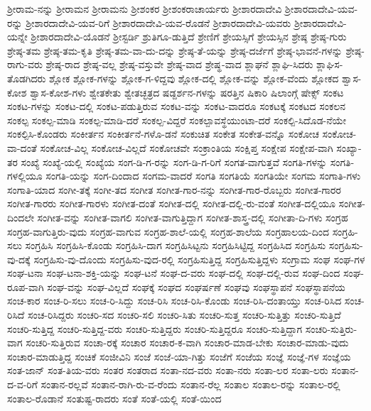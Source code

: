 {ಶ್ರೀರಾಮ-ನನ್ನು
ಶ್ರೀರಾಮನ
ಶ್ರೀರಾಮನು
ಶ್ರೀಶಂಕರ
ಶ್ರೀಶಂಕರಾಚಾರ್ಯರು
ಶ್ರೀಶಾರದಾದೇವಿ
ಶ್ರೀಶಾರದಾದೇವಿ-ಯವ-ರನ್ನು
ಶ್ರೀಶಾರದಾದೇವಿ-ಯವ-ರಿಗೆ
ಶ್ರೀಶಾರದಾದೇವಿ-ಯವ-ರೊಡನೆ
ಶ್ರೀಶಾರದಾದೇವಿ-ಯವರು
ಶ್ರೀಶಾರದಾದೇವಿ-ಯನ್ನೇ
ಶ್ರೀಶಾರದಾದೇವಿ-ಯೊಡನೆ
ಶ್ರೀಸ್ಟರ್ಡಿ
ಶ್ರುತಿಗೂ-ಡುತ್ತಿದೆ
ಶ್ರೇಣಿಗೆ
ಶ್ರೇಯಸ್ಸಿಗೆ
ಶ್ರೇಯಸ್ಸಿನ
ಶ್ರೇಷ್ಠ
ಶ್ರೇಷ್ಠ-ಗುರು
ಶ್ರೇಷ್ಠ-ತಮ
ಶ್ರೇಷ್ಠ-ತಮ-ಕೃತಿ
ಶ್ರೇಷ್ಠ-ತಮ-ವಾ-ದು-ದನ್ನು
ಶ್ರೇಷ್ಠ-ತೆ-ಯನ್ನು
ಶ್ರೇಷ್ಠ-ದರ್ಜೆಗೆ
ಶ್ರೇಷ್ಠ-ಭಾವನೆ-ಗಳನ್ನು
ಶ್ರೇಷ್ಠ-ರಾಗು-ವರು
ಶ್ರೇಷ್ಠ-ರಾದ
ಶ್ರೇಷ್ಠ-ವಲ್ಲ
ಶ್ರೇಷ್ಠ-ವಸ್ತುವೇ
ಶ್ರೇಷ್ಠ-ವಾದ
ಶ್ರೇಷ್ಥ-ವಾದ
ಶ್ಲಾಘನೆ
ಶ್ಲಾಘಿ-ಸಿದರು
ಶ್ಲಾಘಿಸ-ತೊಡಗಿದರು
ಶ್ಲೋಕ
ಶ್ಲೋಕ-ಗಳನ್ನು
ಶ್ಲೋಕ-ಗ-ಳಿದ್ದವು
ಶ್ಲೋಕ-ದಲ್ಲಿ
ಶ್ಲೋಕ-ವನ್ನು
ಶ್ಲೋಕ-ವೆಂದು
ಶ್ಲೋಕದ
ಶ್ವಾಸ-ಕೋಶ
ಶ್ವಾಸ-ಕೋಶ-ಗಳು
ಶ್ವೇತಕೇತು
ಶ್ವೇತಚ್ಛತ್ರದ
ಷಡ್ದರ್ಶನ-ಗಳನ್ನು
ಷರತ್ತಿನ
ಷಿಕಾರಿ
ಷಿಲಾಂಗ್ಗೆ
ಷೇಕ್ಸ್
ಸಂಕಟ
ಸಂಕಟ-ಗಳನ್ನು
ಸಂಕಟ-ದಲ್ಲಿ
ಸಂಕಟ-ಪಡುತ್ತಿರುವ
ಸಂಕಟ-ವನ್ನು
ಸಂಕಟ-ವಾದರೂ
ಸಂಕಟಕ್ಕೆ
ಸಂಕಟದ
ಸಂಕಲನ
ಸಂಕಲ್ಪ
ಸಂಕಲ್ಪ-ಮಾಡಿ
ಸಂಕಲ್ಪ-ಮಾಡಿ-ದರೆ
ಸಂಕಲ್ಪ-ವಿದ್ದರೆ
ಸಂಕಲ್ಪಾವಸ್ಥೆಯುಂಟಾ-ದರೆ
ಸಂಕಲ್ಪಿ-ಸಿದೊಡ-ನೆಯೇ
ಸಂಕಲ್ಪಿಸಿ-ಕೊಂಡರು
ಸಂಕೀರ್ತನ
ಸಂಕೀರ್ತನೆ-ಗಳೊ-ಡನೆ
ಸಂಕುಚಿತ
ಸಂಕೇತ
ಸಂಕೇತ-ವನ್ನೊ
ಸಂಕೋಚ
ಸಂಕೋಚ-ವಾ-ದಂತೆ
ಸಂಕೋಚ-ವಿಲ್ಲ
ಸಂಕೋಚ-ವಿಲ್ಲದೆ
ಸಂಕೋಚವೇ
ಸಂಕ್ರಾಂತಿಯ
ಸಂಕ್ಷಿಪ್ತ
ಸಂಕ್ಷೇಪ
ಸಂಕ್ಷೇಪ-ವಾಗಿ
ಸಂಖ್ಯಾ-ತರ
ಸಂಖ್ಯೆ
ಸಂಖ್ಯೆ-ಯಲ್ಲಿ
ಸಂಖ್ಯೆಯ
ಸಂಗ-ಡಿ-ಗ-ರನ್ನು
ಸಂಗ-ಡಿ-ಗ-ರಿಗೆ
ಸಂಗತ-ವಾಗುತ್ತವೆ
ಸಂಗತಿ-ಗಳನ್ನು
ಸಂಗತಿ-ಗಳಲ್ಲಿಯೂ
ಸಂಗತಿ-ಯನ್ನು
ಸಂಗ-ದಿಂದಾದ
ಸಂಗಮ-ವಾದರೆ
ಸಂಗತಿ
ಸಂಗತಿಯೆ
ಸಂಗತಿಯೇ
ಸಂಗಮ
ಸಂಗಾತಿ-ಗಳು
ಸಂಗಾತಿ-ಯಾದ
ಸಂಗೀ-ತಕ್ಕೆ
ಸಂಗೀ-ತದ
ಸಂಗೀತ
ಸಂಗೀತ-ಗಾರ-ನನ್ನು
ಸಂಗೀತ-ಗಾರ-ರೊಬ್ಬರು
ಸಂಗೀತ-ಗಾರರ
ಸಂಗೀತ-ಗಾರರು
ಸಂಗೀತ-ಗಾರಳು
ಸಂಗೀತ-ದಂತೆ
ಸಂಗೀತ-ದಲ್ಲಿ
ಸಂಗೀತ-ದಲ್ಲಿ-ರು-ವಂತೆ
ಸಂಗೀತ-ದಲ್ಲಿಯೂ
ಸಂಗೀತ-ದಿಂದಲೇ
ಸಂಗೀತ-ವನ್ನು
ಸಂಗೀತ-ವಾಗಲಿ
ಸಂಗೀತ-ವಾಗುತ್ತಿದ್ದಾಗ
ಸಂಗೀತ-ಶಾಸ್ತ್ರ-ದಲ್ಲಿ
ಸಂಗೀತಾ-ದಿ-ಗಳು
ಸಂಗ್ರಹ
ಸಂಗ್ರಹ-ವಾಗುತ್ತಿರು-ವುದು
ಸಂಗ್ರಹ-ವಾಗುವ
ಸಂಗ್ರಹ-ಶಾಲೆ-ಯಲ್ಲಿ
ಸಂಗ್ರಹ-ಶಾಲೆಯ
ಸಂಗ್ರಹಾಲಯ-ದಿಂದ
ಸಂಗ್ರಹಿ-ಸಲು
ಸಂಗ್ರಹಿಸಿ
ಸಂಗ್ರಹಿಸಿ-ಕೊಂಡು
ಸಂಗ್ರಹಿಸಿ-ದಾಗ
ಸಂಗ್ರಹಿಸಿಟ್ಟನು
ಸಂಗ್ರಹಿಸಿಟ್ಟಿದ್ದ
ಸಂಗ್ರಹಿಸಿದ
ಸಂಗ್ರಹಿಸು
ಸಂಗ್ರಹಿಸು-ವು-ದಕ್ಕೆ
ಸಂಗ್ರಹಿಸು-ವು-ದೊಂದು
ಸಂಗ್ರಹಿಸು-ವುದ-ರಲ್ಲಿ
ಸಂಗ್ರಹಿಸುತ್ತಿದ್ದ
ಸಂಗ್ರಹಿಸುತ್ತಿದ್ದಳು
ಸಂಗ್ರಾಮ
ಸಂಘ
ಸಂಘ-ಗಳ
ಸಂಘ-ಟನಾ
ಸಂಘ-ಟನಾ-ಶಕ್ತಿ-ಯನ್ನು
ಸಂಘ-ಟನೆ
ಸಂಘ-ದ-ವರು
ಸಂಘ-ದಲ್ಲಿ
ಸಂಘ-ದಲ್ಲಿ-ರುವ
ಸಂಘ-ದಿಂದ
ಸಂಘ-ರೂಪ-ವಾಗಿ
ಸಂಘ-ವನ್ನು
ಸಂಘ-ವಿಲ್ಲದೆ
ಸಂಘಕ್ಕೆ
ಸಂಘದ
ಸಂಘರ್ಷಣೆ
ಸಂಘವು
ಸಂಘಸ್ಥಾಪನೆ
ಸಂಘಸ್ಥಾಪನೆಯ
ಸಂಚ-ಕಾರ
ಸಂಚ-ರಿ-ಸಲು
ಸಂಚ-ರಿ-ಸಿದ್ದು
ಸಂಚ-ರಿಸಿ
ಸಂಚ-ರಿಸಿ-ಕೊಂಡು
ಸಂಚ-ರಿಸಿ-ದಂತಾಯ್ತು
ಸಂಚ-ರಿಸಿದ
ಸಂಚ-ರಿಸಿದೆ
ಸಂಚ-ರಿಸಿದ್ದರು
ಸಂಚರಿ-ಸದ
ಸಂಚರಿ-ಸಲಿ
ಸಂಚರಿ-ಸಿತು
ಸಂಚರಿ-ಸುತ್ತ
ಸಂಚರಿ-ಸುತ್ತಿತ್ತು
ಸಂಚರಿ-ಸುತ್ತಿದೆ
ಸಂಚರಿ-ಸುತ್ತಿದ್ದ
ಸಂಚರಿ-ಸುತ್ತಿದ್ದ-ವರು
ಸಂಚರಿ-ಸುತ್ತಿದ್ದರು
ಸಂಚರಿ-ಸುತ್ತಿದ್ದರೂ
ಸಂಚರಿ-ಸುತ್ತಿದ್ದಾಗ
ಸಂಚರಿ-ಸುತ್ತಿರು-ವಾಗ
ಸಂಚರಿ-ಸುತ್ತಿರುವ
ಸಂಚಾ-ರಕ್ಕೆ
ಸಂಚಾರ
ಸಂಚಾರ-ಕ-ವಾಗಿ
ಸಂಚಾರ-ಮಾಡ-ಬೇಕು
ಸಂಚಾರ-ಮಾಡು-ವುದು
ಸಂಚಾರ-ಮಾಡುತ್ತಿದ್ದ
ಸಂಚಿಕೆ
ಸಂಜೀವಿನಿ
ಸಂಜೆ
ಸಂಜೆ-ಯಾ-ಗಿತ್ತು
ಸಂಜೆಗೆ
ಸಂಜೆಯ
ಸಂಜ್ಞೆ
ಸಂಜ್ಞೆ-ಗಳ
ಸಂಜ್ಞೆಯ
ಸಂತ-ಜಾನ್
ಸಂತ-ತಿಯ-ವರು
ಸಂತರ
ಸಂತರಾದ
ಸಂತಾ-ನದ-ವರು
ಸಂತಾ-ನರು
ಸಂತಾ-ಲರ
ಸಂತಾ-ಲರು
ಸಂತಾನ-ದ-ವ-ರಿಗೆ
ಸಂತಾನ-ರಲ್ಲವೆ
ಸಂತಾನ-ರಾಗಿ-ರು-ವ-ರೆಂದು
ಸಂತಾನ-ರೆಲ್ಲ
ಸಂತಾಲ
ಸಂತಾಲ-ರನ್ನು
ಸಂತಾಲ-ರಲ್ಲಿ
ಸಂತಾಲ-ರೊಡಾನೆ
ಸಂತುಷ್ಟ-ರಾದರು
ಸಂತೆ
ಸಂತೆ-ಯಲ್ಲಿ
ಸಂತೆ-ಯಿಂದ
}
